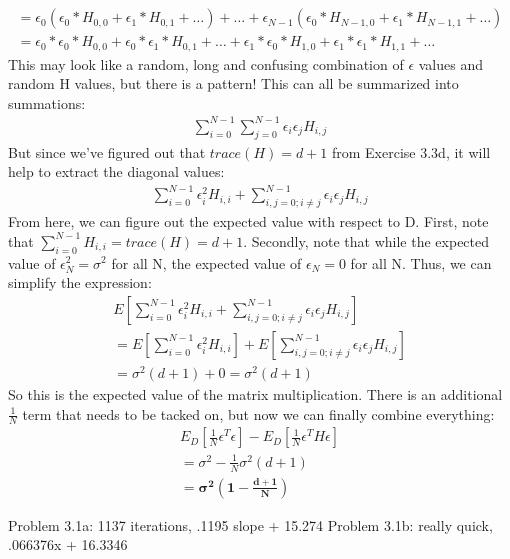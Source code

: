 \documentclass[12pt]{article}
\begin{document}
\begin{enumerate}[label=(\alph*)]
\begin{gather*}
	\\ = \epsilon_0 (\epsilon_0 * H_{0, 0} + \epsilon_1 * H_{0, 1} + \dots) + \dots + \epsilon_{N-1} (\epsilon_0 * H_{N-1, 0} + \epsilon_1 * H_{N-1, 1} + \dots)
	\\ = \epsilon_0 * \epsilon_0 * H_{0, 0} + \epsilon_0 * \epsilon_1 * H_{0, 1} + \dots + \epsilon_1 * \epsilon_0 * H_{1, 0} + \epsilon_1 * \epsilon_1 * H_{1,1} + \dots
	\end{gather*}
	This may look like a random, long and confusing combination of $\epsilon$ values and random H values, but there is a pattern! This can all be summarized into summations:
	\begin{gather*}
		\sum^{N-1}_{i=0}\sum^{N-1}_{j=0}\epsilon_i\epsilon_jH_{i,j}
	\end{gather*}
	But since we've figured out that $trace(H) = d+1$ from Exercise 3.3d, it will help to extract the diagonal values:
	\begin{gather*}
	\sum^{N-1}_{i=0}\epsilon_i^2H_{i,i} + \sum^{N-1}_{i,j=0; i \neq j}\epsilon_i\epsilon_jH_{i,j}
	\end{gather*}
	From here, we can figure out the expected value with respect to D. First, note that $\sum^{N-1}_{i=0}H_{i,i} = trace(H) = d+1$. Secondly, note that while the expected value of $\epsilon_N^2 = \sigma^2$ for all N, the expected value of $\epsilon_N = 0$ for all N. Thus, we can simplify the expression:
	\begin{gather*}
	E[\sum^{N-1}_{i=0}\epsilon_i^2H_{i,i} + \sum^{N-1}_{i,j=0; i \neq j}\epsilon_i\epsilon_jH_{i,j}]
	\\ = E[\sum^{N-1}_{i=0}\epsilon_i^2H_{i,i}] + E[\sum^{N-1}_{i,j=0; i \neq j}\epsilon_i\epsilon_jH_{i,j}]
	\\ = \sigma^2(d+1) + 0 = \sigma^2(d+1)
	\end{gather*}
	So this is the expected value of the matrix multiplication. There is an additional $\frac{1}{N}$ term that needs to be tacked on, but now we can finally combine everything:
	\begin{gather*}
	E_D[\frac{1}{N}\epsilon^T\epsilon] - E_D[\frac{1}{N}\epsilon^TH\epsilon]
	\\ = \sigma^2 - \frac{1}{N}\sigma^2(d+1)
	\\ = \boldsymbol{\sigma^2 (1 - \frac{d+1}{N})}
	\end{gather*}
\end{enumerate}

Problem 3.1a: 1137 iterations, .1195 slope + 15.274
Problem 3.1b: really quick, .066376x + 16.3346
\end{document}
